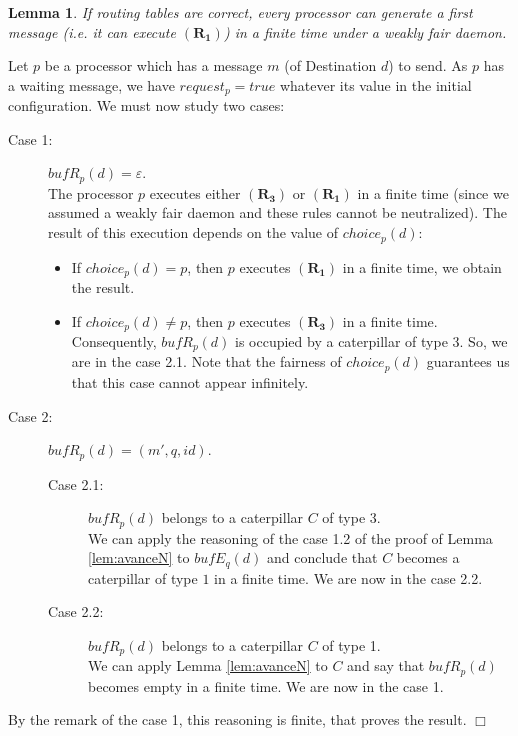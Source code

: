 \documentclass[11pt]{article}
\newtheorem{lemma}{Lemma}
\newenvironment{proof}{{\noindent\bf Proof. } }{{\hfill $\Box$}}
\begin{document}
\begin{lemma} \label{lem:depotN}
If routing tables are correct, every processor can generate a first message (\emph{i.e.} it can execute $\boldsymbol{(R_{1})}$) in a finite time under a weakly fair daemon.
\end{lemma}

\begin{proof}
Let $p$ be a processor which has a message $m$ (of Destination $d$) to send. As $p$ has a waiting message, we have $request_{p}=true$ whatever its value in the initial configuration. We must now study two cases:

\begin{description}
\item [Case 1:] $bufR_{p}(d)=\varepsilon$.\\
The processor $p$ executes either $\boldsymbol{(R_{3})}$ or $\boldsymbol{(R_{1})}$ in a finite time (since we assumed a weakly fair daemon and these rules cannot be neutralized).
The result of this execution depends on the value of $choice_{p}(d)$:

\begin{itemize}
\item If $choice_{p}(d)=p$, then $p$ executes $\boldsymbol{(R_{1})}$ in a finite time, we obtain the result.
\item If $choice_{p}(d)\neq p$, then $p$ executes $\boldsymbol{(R_{3})}$ in a finite time. Consequently, $bufR_{p}(d)$ is occupied by a caterpillar of type 3. So, we are in the case 2.1. Note that the fairness of $choice_{p}(d)$ guarantees us that this case cannot appear infinitely. 
\end{itemize}

\item [Case 2:] $bufR_{p}(d)=(m',q,id)$.\\

\begin{description}
\item [Case 2.1:] $bufR_{p}(d)$ belongs to a caterpillar $C$ of type 3.\\
We can apply the reasoning of the case 1.2 of the proof of Lemma \ref{lem:avanceN} to $bufE_{q}(d)$ and conclude that $C$ becomes a caterpillar of type $1$ in a finite time. We are now in the case 2.2.
\item [Case 2.2:] $bufR_{p}(d)$ belongs to a caterpillar $C$ of type 1.\\
We can apply Lemma \ref{lem:avanceN} to $C$ and say that $bufR_{p}(d)$ becomes empty in a finite time. We are now in the case 1.
\end{description}

\end{description}

By the remark of the case 1, this reasoning is finite, that proves the result.
\end{proof}
\end{document}
